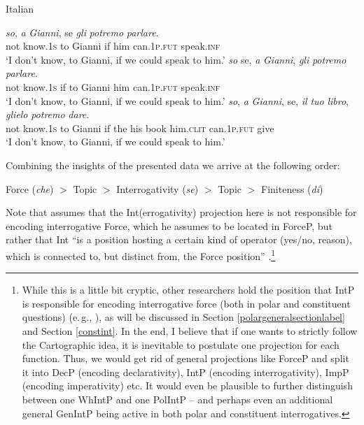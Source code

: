 \begin{exe}
\ex Italian \citep[205]{rizzi2013notes} \label{yesnoembeddedint}\begin{xlist} 
\ex {} {\textit{so},} {\textit{a}} {\textit{Gianni},} {se} {\textit{gli}} {\textit{potremo}} {\textit{parlare}.}  \\
{not} {know.\textsc{1s}} {to} {Gianni} {if} {him} {can.\textsc{1p.fut}} {speak.\textsc{inf}} \\
\trans `I don't know, to Gianni, if we could speak to him.' \label{ex:yesnoembeddedinta}
\ex {} {\textit{so}} {se,} {\textit{a}} {\textit{Gianni},} {\textit{gli}} {\textit{potremo}} {\textit{parlare}.}  \\
{not} {know.\textsc{1s}} {if} {to} {Gianni} {him} {can.\textsc{1p.fut}} {speak.\textsc{inf}} \\
\trans `I don't know, to Gianni, if we could speak to him.' \label{ex:yesnoembeddedintb}
\ex {} {\textit{so},} {\textit{a}} {\textit{Gianni},} {se,} {\textit{il}} {\textit{tuo}} {\textit{libro},} {\textit{glielo}} {\textit{potremo}} {\textit{dare}.}  \\
{not} {know.\textsc{1s}} {to} {Gianni} {if} {the} {his} {book} {him.\textsc{clit}} {can.\textsc{1p.fut}} {give} \\
\trans `I don't know, to Gianni, if we could speak to him.' \label{ex:yesnoembeddedintc}
\end{xlist}
\end{exe}


\noindent Combining the insights of the presented data we arrive at the following order:

\begin{exe}
\ex Force (\textit{che}) $>$ Topic $>$ Interrogativity (\textit{se}) $>$ Topic $>$ Finiteness (\textit{di})
\end{exe}

\noindent Note that \citet{rizzi2001position} assumes that the Int(errogativity) projection here is not responsible for encoding interrogative Force, which he assumes to be located in ForceP, but rather that Int ``is a position hosting a certain kind of operator (yes/no, reason), which is connected to, but distinct from, the Force position'' \citep[206]{rizzi2013notes}.\footnote{ While this is a little bit cryptic, other researchers hold the position that IntP is responsible for encoding interrogative force (both in polar and constituent questions) (e.\,g., \citealt{aboh2010sa}), as will be discussed in Section \ref{polargeneralsectionlabel} and Section \ref{constint}. In the end, I believe that if one wants to strictly follow the Cartographic idea, it is inevitable to postulate one projection for each function. Thus, we would get rid of general projections like ForceP and split it into DecP (encoding declarativity), IntP (encoding interrogativity), ImpP (encoding imperativity) etc. It would even be plausible to further distinguish between one WhIntP and one PolIntP -- and perhaps even an additional general GenIntP being active in both polar and constituent interrogatives.}

